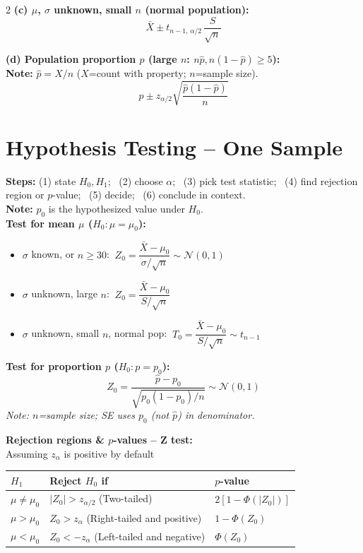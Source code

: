 \documentclass[9pt,a4paper]{extarticle}
\renewcommand{\arraystretch}{1.1}
\newcommand{\sh}[1]{\textbf{\color{BrickRed} #1}}
\begin{document}
\begin{multicols*}{2}
\sh{(c) $\mu$, $\sigma$ unknown, small $n$ (normal population):}
\[
\bar{X}\pm t_{n-1,\,\alpha/2}\,\frac{S}{\sqrt{n}}
\]

\sh{(d) Population proportion $p$ (large $n$: $n\hat{p},n(1-\hat{p})\ge 5$):}
\\
\textbf{Note:} $\hat{p}=X/n$ ($X$=count with property; $n$=sample size).\\


\[
\hat{p}\pm z_{\alpha/2}\sqrt{\frac{\hat{p}(1-\hat{p})}{n}}
\]


\section{Hypothesis Testing -- One Sample}

\textbf{Steps:} (1) state $H_0,H_1$; \ (2) choose $\alpha$; \ (3) pick test statistic; \ (4) find rejection region or $p$-value; \ (5) decide; \ (6) conclude in context.
\\
\textbf{Note:} $p_0$ is the hypothesized value under $H_0$.
\\
\sh{Test for mean $\mu$ ($H_0:\mu=\mu_0$):}

\begin{itemize}[leftmargin=*,topsep=0pt,itemsep=0pt]
\item $\sigma$ known, or $n\ge 30$: $\ Z_0=\dfrac{\bar{X}-\mu_0}{\sigma/\sqrt{n}}\sim\mathcal{N}(0,1)$
\item $\sigma$ unknown, large $n$: $\ Z_0=\dfrac{\bar{X}-\mu_0}{S/\sqrt{n}}$
\item $\sigma$ unknown, small $n$, normal pop: $\ T_0=\dfrac{\bar{X}-\mu_0}{S/\sqrt{n}}\sim t_{n-1}$
\end{itemize}

\sh{Test for proportion $p$ ($H_0:p=p_0$):}
\[
Z_0=\frac{\hat{p}-p_0}{\sqrt{p_0(1-p_0)/n}}\sim\mathcal{N}(0,1)
\]
\textit{Note: $n$=sample size; SE uses $p_0$ (not $\hat{p}$) in denominator.}

\sh{Rejection regions \& $p$-values -- Z test:} \\
Assuming $z_\alpha$ is positive by default
\begin{center}\small
\renewcommand{\arraystretch}{1.2}
\begin{tabular}{@{}lll@{}}
\toprule
$H_1$ & Reject $H_0$ if & $p$-value \\
\midrule
$\mu\ne\mu_0$ & $|Z_0|>z_{\alpha/2}$ (Two-tailed) & $2[1-\Phi(|Z_0|)]$ \\
$\mu>\mu_0$   & $Z_0>z_{\alpha}$  (Right-tailed and positive)   & $1-\Phi(Z_0)$ \\
$\mu<\mu_0$   & $Z_0<-z_{\alpha}$ (Left-tailed and negative)   & $\Phi(Z_0)$ \\
\bottomrule
\end{tabular}
\end{center}


\end{multicols*}
\end{document}
